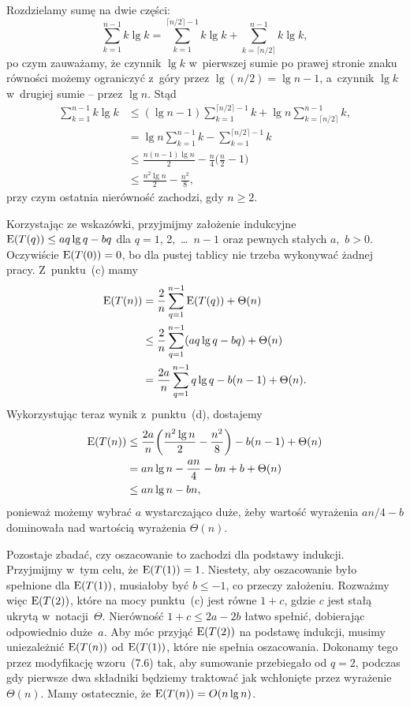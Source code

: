 \subproblem %
Rozdzielamy sumę na dwie części:
\[
	\sum_{k=1}^{n-1}k\lg k = \sum_{k=1}^{\lceil n/2\rceil-1}k\lg k+\sum_{k=\lceil n/2\rceil}^{n-1}k\lg k,
\]
po czym zauważamy, że czynnik $\lg k$ w~pierwszej sumie po prawej stronie znaku równości możemy ograniczyć z~góry przez $\lg(n/2)=\lg n-1$, a~czynnik $\lg k$ w~drugiej sumie -- przez $\lg n$. Stąd
\begin{align*}
	\sum_{k=1}^{n-1}k\lg k &\le (\lg n-1)\sum_{k=1}^{\lceil n/2\rceil-1}k+\lg n\sum_{k=\lceil n/2\rceil}^{n-1}k, \\
	&= \lg n\sum_{k=1}^{n-1}k-\sum_{k=1}^{\lceil n/2\rceil-1}k \\[2mm]
	&\le \frac{n(n-1)\lg n}{2}-\frac{n}{4}\biggl(\frac{n}{2}-1\biggr) \\[1mm]
	&\le \frac{n^2\lg n}{2}-\frac{n^2}{8},
\end{align*}
przy czym ostatnia nierówność zachodzi, gdy $n\ge2$.

\subproblem %
Korzystając ze wskazówki, przyjmijmy założenie indukcyjne $\operatorname{E}(T(q))\le aq\lg q-bq$ dla $q=1$, 2,~\dots~$n-1$ oraz pewnych stałych $a$,~$b>0$. Oczywiście $\operatorname{E}(T(0))=0$, bo dla pustej tablicy nie trzeba wykonywać żadnej pracy. Z~punktu~(c) mamy
\begin{align*}
	\operatorname{E}(T(n)) &= \frac{2}{n}\sum_{q=1}^{n-1}\operatorname{E}(T(q))+\Theta(n) \\
	&\le \frac{2}{n}\sum_{q=1}^{n-1}(aq\lg q-bq)+\Theta(n) \\
	&= \frac{2a}{n}\sum_{q=1}^{n-1}q\lg q-b(n-1)+\Theta(n).
\end{align*}
Wykorzystując teraz wynik z~punktu~(d), dostajemy
\begin{align*}
	\operatorname{E}(T(n)) &\le \frac{2a}{n}\biggl(\frac{n^2\lg n}{2}-\frac{n^2}{8}\biggr)-b(n-1)+\Theta(n) \\
	&= an\lg n-\frac{an}{4}-bn+b+\Theta(n) \\
	&\le an\lg n-bn,
\end{align*}
ponieważ możemy wybrać $a$ wystarczająco duże, żeby wartość wyrażenia $an/4-b$ dominowała nad wartością wyrażenia $\Theta(n)$.

Pozostaje zbadać, czy oszacowanie to zachodzi dla podstawy indukcji. Przyjmijmy w~tym celu, że $\operatorname{E}(T(1))=1$. Niestety, aby oszacowanie było spełnione dla $\operatorname{E}(T(1))$, musiałoby być $b\le-1$, co przeczy założeniu. Rozważmy więc $\operatorname{E}(T(2))$, które na mocy punktu~(c) jest równe $1+c$, gdzie $c$ jest stałą ukrytą w~notacji~$\Theta$. Nierówność $1+c\le2a-2b$ łatwo spełnić, dobierając odpowiednio duże~$a$. Aby móc przyjąć $\operatorname{E}(T(2))$ na podstawę indukcji, musimy uniezależnić $\operatorname{E}(T(n))$ od $\operatorname{E}(T(1))$, które nie spełnia oszacowania. Dokonamy tego przez modyfikację wzoru~(7.6) tak, aby sumowanie przebiegało od $q=2$, podczas gdy pierwsze dwa składniki będziemy traktować jak wchłonięte przez wyrażenie $\Theta(n)$. Mamy ostatecznie, że $\operatorname{E}(T(n))=O(n\lg n)$.

